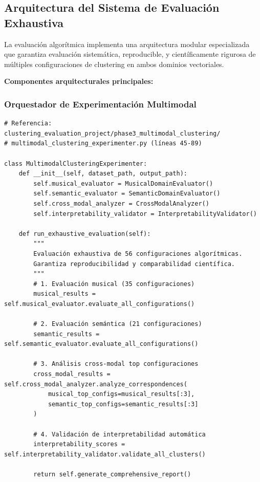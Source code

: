 \documentclass[12pt,a4paper]{article}
\begin{document}
\subsection{Arquitectura del Sistema de Evaluación Exhaustiva}

La evaluación algorítmica implementa una arquitectura modular especializada que garantiza evaluación sistemática, reproducible, y científicamente rigurosa de múltiples configuraciones de clustering en ambos dominios vectoriales.

\textbf{Componentes arquitecturales principales:}

\subsubsection{Orquestador de Experimentación Multimodal}

\begin{lstlisting}[caption={Arquitectura del Sistema de Evaluación Multimodal}]
# Referencia: clustering_evaluation_project/phase3_multimodal_clustering/
# multimodal_clustering_experimenter.py (líneas 45-89)

class MultimodalClusteringExperimenter:
    def __init__(self, dataset_path, output_path):
        self.musical_evaluator = MusicalDomainEvaluator()
        self.semantic_evaluator = SemanticDomainEvaluator()
        self.cross_modal_analyzer = CrossModalAnalyzer()
        self.interpretability_validator = InterpretabilityValidator()

    def run_exhaustive_evaluation(self):
        """
        Evaluación exhaustiva de 56 configuraciones algorítmicas.
        Garantiza reproducibilidad y comparabilidad científica.
        """
        # 1. Evaluación musical (35 configuraciones)
        musical_results = self.musical_evaluator.evaluate_all_configurations()

        # 2. Evaluación semántica (21 configuraciones)
        semantic_results = self.semantic_evaluator.evaluate_all_configurations()

        # 3. Análisis cross-modal top configuraciones
        cross_modal_results = self.cross_modal_analyzer.analyze_correspondences(
            musical_top_configs=musical_results[:3],
            semantic_top_configs=semantic_results[:3]
        )

        # 4. Validación de interpretabilidad automática
        interpretability_scores = self.interpretability_validator.validate_all_clusters()

        return self.generate_comprehensive_report()
\end{lstlisting}
\end{document}
